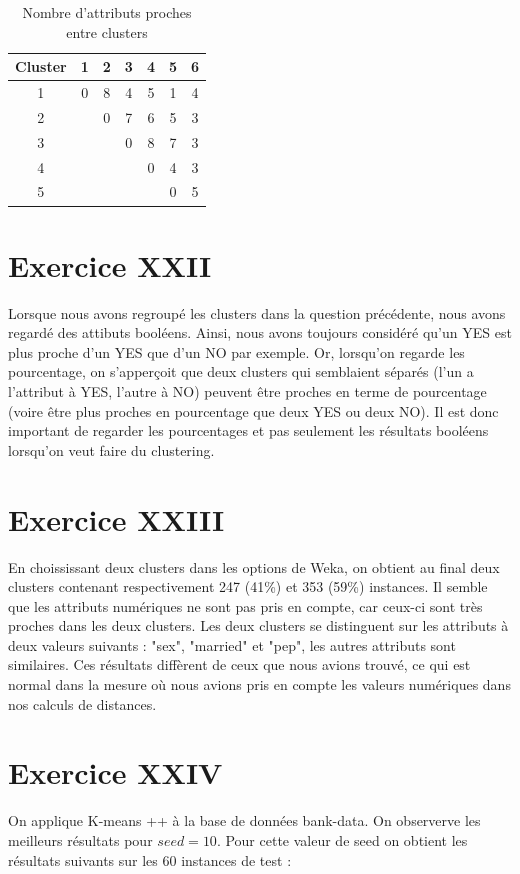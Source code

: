 \documentclass[a4paper, 11pt]{report}
\begin{document}
	\begin{table}[h!]
\centering
\begin{tabular}{| c | c | c | c | c | c | c |}
\hline
Cluster & 1 & 2 & 3 & 4 & 5 & 6 \\
\hline
1 & 0 & 8 & 4 & 5 & 1 & 4 \\
\hline
2 & & 0 & 7 & 6 & 5 & 3 \\
\hline
3 & & & 0 & 8 & 7 & 3 \\
\hline
4 & & & & 0 & 4 & 3 \\
\hline
5 & & & & & 0 & 5 \\
\hline

\end{tabular}
\caption{Nombre d'attributs proches entre clusters}
\label{tab:exo20}
\end{table}

	\section{Exercice XXII}
	Lorsque nous avons regroupé les clusters dans la question précédente, nous avons regardé des attibuts booléens. Ainsi, nous avons toujours considéré qu'un YES est plus proche d'un YES que d'un NO par exemple. Or, lorsqu'on regarde les pourcentage, on s'apperçoit que deux clusters qui semblaient séparés (l'un a l'attribut à YES, l'autre à NO) peuvent être proches en terme de pourcentage (voire être plus proches en pourcentage que deux YES ou deux NO). Il est donc important de regarder les pourcentages et pas seulement les résultats booléens lorsqu'on veut faire du clustering.

	\section{Exercice XXIII}
	En choississant deux clusters dans les options de Weka, on obtient au final deux clusters contenant respectivement 247 (41\%) et 353 (59\%) instances. Il semble que les attributs numériques ne sont pas pris en compte, car ceux-ci sont très proches dans les deux clusters. Les deux clusters se distinguent sur les attributs à deux valeurs suivants : "sex", "married" et "pep", les autres attributs sont similaires. Ces résultats diffèrent de ceux que nous avions trouvé, ce qui est normal dans la mesure où nous avions pris en compte les valeurs numériques dans nos calculs de distances.

   
        \section{Exercice XXIV}
        On applique K-means ++ à la base de données bank-data. On observerve les meilleurs résultats pour $seed = 10$. Pour cette valeur de seed on obtient les résultats suivants sur les 60 instances de test :
        
\end{document}
